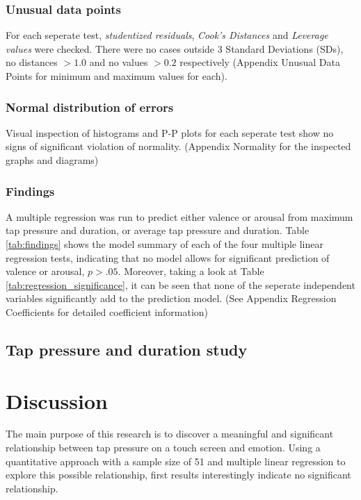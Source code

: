 \documentclass{sigchi}
\begin{document}
\subsubsection{Unusual data points} %
\label{subsub:unusual_data_points}
For each seperate test, \textit{studentized residuals}, \textit{Cook's Distances} and \textit{Leverage values} were checked. There were no cases outside 3 Standard Deviations (SDs), no distances $> 1.0$ and no values $> 0.2$ respectively (Appendix Unusual Data Points for minimum and maximum values for each).

\subsubsection{Normal distribution of errors} %
\label{subsub:normal_distribution_of_errors}
Visual inspection of histograms and P-P plots for each seperate test show no signs of significant violation of normality. (Appendix Normality for the inspected graphs and diagrams)

\subsubsection{Findings} %
\label{sub:findings}
A multiple regression was run to predict either valence or arousal from maximum tap pressure and duration, or average tap pressure and duration. Table \ref{tab:findings} shows the model summary of each of the four multiple linear regression tests, indicating that no model allows for significant prediction of valence or arousal, $p > .05$. Moreover, taking a look at Table \ref{tab:regression_significance}, it can be seen that none of the seperate independent variables significantly add to the prediction model. (See Appendix Regression Coefficients for detailed coefficient information)



\subsection{Tap pressure and duration study}



\section{Discussion} %
\label{sec:discussion}
The main purpose of this research is to discover a meaningful and significant relationship between tap pressure on a touch screen and emotion. Using a quantitative approach with a sample size of 51 and multiple linear regression to explore this possible relationship, first results interestingly indicate no significant relationship.
\end{document}
